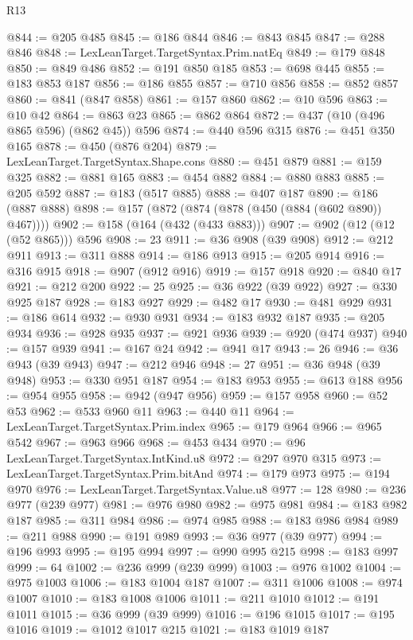 \begin{lexlean}{R13}
\begin{coremodule}
@844 := @205 @485
@845 := @186 @844
@846 := @843 @845
@847 := @288 @846
@848 := LexLeanTarget.TargetSyntax.Prim.natEq
@849 := @179 @848
@850 := @849 @486
@852 := @191 @850 @185
@853 := @698 @445
@855 := @183 @853 @187
@856 := @186 @855
@857 := @710 @856
@858 := @852 @857
@860 := @841 (@847 @858)
@861 := @157 @860
@862 := @10 @596
@863 := @10 @42
@864 := @863 @23
@865 := @862 @864
@872 := @437 (@10 (@496 @865 @596) (@862 @45)) @596
@874 := @440 @596 @315
@876 := @451 @350 @165
@878 := @450 (@876 @204)
@879 := LexLeanTarget.TargetSyntax.Shape.cons
@880 := @451 @879
@881 := @159 @325
@882 := @881 @165
@883 := @454 @882
@884 := @880 @883
@885 := @205 @592
@887 := @183 (@517 @885)
@888 := @407 @187
@890 := @186 (@887 @888)
@898 := @157 (@872 (@874 (@878 (@450 (@884 (@602 @890)) @467))))
@902 := @158 (@164 (@432 (@433 @883)))
@907 := @902 (@12 (@12 (@52 @865))) @596
@908 := 23
@911 := @36 @908 (@39 @908)
@912 := @212 @911
@913 := @311 @888
@914 := @186 @913
@915 := @205 @914
@916 := @316 @915
@918 := @907 (@912 @916)
@919 := @157 @918
@920 := @840 @17
@921 := @212 @200
@922 := 25
@925 := @36 @922 (@39 @922)
@927 := @330 @925 @187
@928 := @183 @927
@929 := @482 @17
@930 := @481 @929
@931 := @186 @614
@932 := @930 @931
@934 := @183 @932 @187
@935 := @205 @934
@936 := @928 @935
@937 := @921 @936
@939 := @920 (@474 @937)
@940 := @157 @939
@941 := @167 @24
@942 := @941 @17
@943 := 26
@946 := @36 @943 (@39 @943)
@947 := @212 @946
@948 := 27
@951 := @36 @948 (@39 @948)
@953 := @330 @951 @187
@954 := @183 @953
@955 := @613 @188
@956 := @954 @955
@958 := @942 (@947 @956)
@959 := @157 @958
@960 := @52 @53
@962 := @533 @960 @11
@963 := @440 @11
@964 := LexLeanTarget.TargetSyntax.Prim.index
@965 := @179 @964
@966 := @965 @542
@967 := @963 @966
@968 := @453 @434
@970 := @96 LexLeanTarget.TargetSyntax.IntKind.u8
@972 := @297 @970 @315
@973 := LexLeanTarget.TargetSyntax.Prim.bitAnd
@974 := @179 @973
@975 := @194 @970
@976 := LexLeanTarget.TargetSyntax.Value.u8
@977 := 128
@980 := @236 @977 (@239 @977)
@981 := @976 @980
@982 := @975 @981
@984 := @183 @982 @187
@985 := @311 @984
@986 := @974 @985
@988 := @183 @986 @984
@989 := @211 @988
@990 := @191 @989
@993 := @36 @977 (@39 @977)
@994 := @196 @993
@995 := @195 @994
@997 := @990 @995 @215
@998 := @183 @997
@999 := 64
@1002 := @236 @999 (@239 @999)
@1003 := @976 @1002
@1004 := @975 @1003
@1006 := @183 @1004 @187
@1007 := @311 @1006
@1008 := @974 @1007
@1010 := @183 @1008 @1006
@1011 := @211 @1010
@1012 := @191 @1011
@1015 := @36 @999 (@39 @999)
@1016 := @196 @1015
@1017 := @195 @1016
@1019 := @1012 @1017 @215
@1021 := @183 @1019 @187

\end{coremodule}
\end{lexlean}
